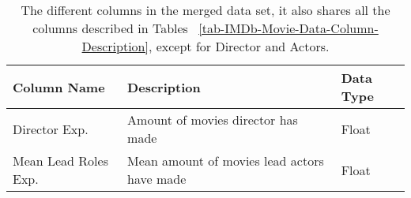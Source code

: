     \begin{table}[H]
        \centering
        \begin{tabular}{lp{9cm}l}
            \toprule
            Column Name          & Description                                 & Data Type \\
            \midrule
            Director Exp.        & Amount of movies director has made          & Float     \\
            Mean Lead Roles Exp. & Mean amount of movies lead actors have made & Float     \\
            \bottomrule
        \end{tabular}
        \caption[short]{The different columns in the merged data set,
            it also shares all the columns described in Tables
            ~\ref{tab-IMDb-Movie-Data-Column-Description},
            except for Director and Actors.}\label{tab-merged-data-column-description}
    \end{table}
